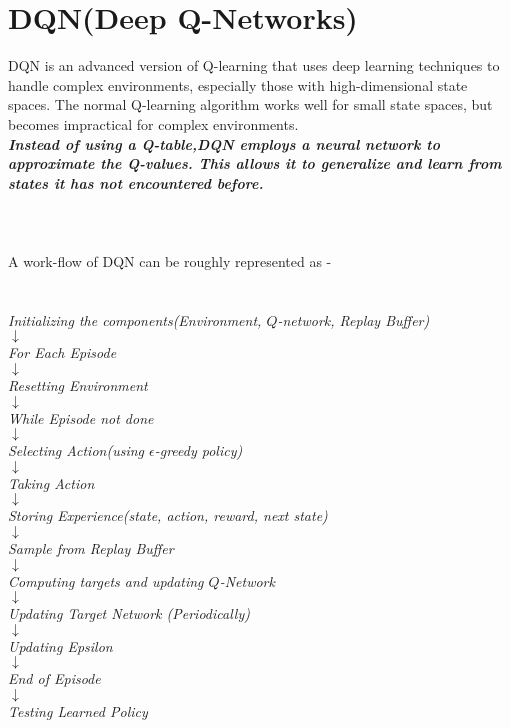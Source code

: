 \documentclass{report}
\begin{document}
\section*{DQN(Deep Q-Networks)}
DQN is an advanced version of Q-learning that uses deep learning techniques to handle complex environments, especially those with high-dimensional state spaces.
The normal Q-learning algorithm works well for small state spaces, but becomes impractical for complex environments. \\ 
\textbf{\textit{Instead of using a Q-table,DQN employs a neural network to \\ approximate the Q-values. This allows it to generalize and learn from states it has not encountered before.}} \\ \\ \\ \\
A work-flow of DQN can be roughly represented as - \\ \\ \\
\textit{
    Initializing the components(Environment, $Q$-network, Replay Buffer) \\
    $\downarrow$ \\
    For Each Episode \\
    $\downarrow$ \\
     Resetting Environment \\
    $\downarrow$ \\ 
    While Episode not done \\
    $\downarrow$ \\
    Selecting Action(using $\epsilon$-greedy policy) \\
    $\downarrow$ \\
    Taking Action \\
    $\downarrow$ \\
    Storing Experience(state, action, reward, next state) \\
    $\downarrow$ \\
    Sample from Replay Buffer \\
    $\downarrow$ \\
    Computing targets and updating $Q$-Network \\
    $\downarrow$ \\
    Updating Target Network (Periodically)   \\
    $\downarrow$ \\
    Updating Epsilon  \\
    $\downarrow$ \\
    End of Episode \\
    $\downarrow$ \\
    Testing Learned Policy \\
}
\newpage
\end{document}
